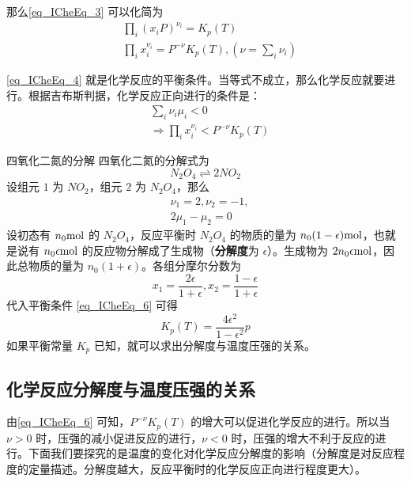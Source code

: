 那么\autoref{eq_ICheEq_3} 可以化简为
\begin{equation}\label{eq_ICheEq_4}
\begin{aligned}
&\prod_i (x_iP)^{\nu_i}=K_p(T)\\
&\prod_i x_i^{\nu_i}=P^{-\nu} K_p(T),(\nu=\sum_i\nu_i)
\end{aligned}
\end{equation}

\autoref{eq_ICheEq_4} 就是化学反应的平衡条件。当等式不成立，那么化学反应就要进行。根据吉布斯判据，化学反应正向进行的条件是：
\begin{equation}\label{eq_ICheEq_6}
\begin{aligned}
&\sum_i \nu_i\mu_i<0\\
&\Rightarrow \prod_i x_i^{\nu_i}<P^{-\nu}K_p(T)
\end{aligned}
\end{equation}

\begin{example}{四氧化二氮的分解}\label{ex_ICheEq_1}
四氧化二氮的分解式为
\begin{equation}
N_2O_4\rightleftharpoons 2NO_2
\end{equation}
设组元 $1$ 为 $NO_2$，组元 $2$ 为 $N_2O_4$，那么
\begin{equation}
\begin{aligned}
&\nu_1=2,\nu_2=-1,\\
&2\mu_1-\mu_2=0
\end{aligned}
\end{equation}
设初态有 $n_0 \rm{mol}$ 的 $N_2O_4$，反应平衡时 $N_2O_4$ 的物质的量为 $n_0(1-\epsilon) \rm{mol}$，也就是说有 $n_0 \epsilon \rm{mol}$ 的反应物分解成了生成物（\textbf{分解度}为 $\epsilon$）。生成物为 $2n_0\epsilon \rm{mol}$，因此总物质的量为 $n_0(1+\epsilon)$。各组分摩尔分数为
\begin{equation}
x_1=\frac{2\epsilon}{1+\epsilon},x_2=\frac{1-\epsilon}{1+\epsilon}
\end{equation}
代入平衡条件 \autoref{eq_ICheEq_6} 可得
\begin{equation}
K_p(T)=\frac{4\epsilon^2}{1-\epsilon^2}p
\end{equation}
如果平衡常量 $K_p$ 已知，就可以求出分解度与温度压强的关系。
\end{example}


\subsection{化学反应分解度与温度压强的关系}
由\autoref{eq_ICheEq_6} 可知，$P^{-\nu}K_p(T)$ 的增大可以促进化学反应的进行。所以当 $\nu>0$ 时，压强的减小促进反应的进行，$\nu<0$ 时，压强的增大不利于反应的进行。下面我们要探究的是温度的变化对化学反应分解度的影响（分解度是对反应程度的定量描述。分解度越大，反应平衡时的化学反应正向进行程度更大）。

